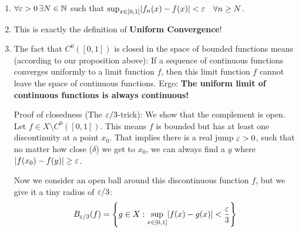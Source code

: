 \begin{solution}
\begin{enumerate}
    \item $\forall \varepsilon > 0 \, \exists N \in \mathbb{N}$ such that $\sup_{x \in [0,1]} \lvert f_n(x) - f(x)\rvert < \varepsilon \quad \forall n \ge N$.
    \item This is exactly the definition of \textcolor{eDarkGreen}{\textbf{Uniform Convergence}}!
    \item The fact that $C^0([0,1])$ is closed in the space of bounded functions means (according to our proposition above): If a sequence of continuous functions converges uniformly to a limit function $f$, then this limit function $f$ cannot leave the space of continuous functions. Ergo: \textbf{The uniform limit of continuous functions is always continuous!}
    
    \textcolor{eSaddleBrown}{Proof of closedness (The $\varepsilon/3$-trick):} 
    We show that the complement is open. Let $f \in X \setminus C^0([0,1])$. This means $f$ is bounded but has at least one discontinuity at a point $x_0$. That implies there is a real jump $\varepsilon > 0$, such that no matter how close ($\delta$) we get to $x_0$, we can always find a $y$ where $\lvert f(x_0) - f(y)\rvert \ge \varepsilon$.
    
    Now we consider an open ball around this discontinuous function $f$, but we give it a tiny radius of $\varepsilon/3$:
    \[ B_{\varepsilon/3}(f) = \left\{ g \in X : \sup_{x \in [0,1]} \lvert f(x) - g(x)\rvert < \frac{\varepsilon}{3} \right\} \]
    
    \begin{center}
\end{center}
\end{enumerate}
\end{solution}
